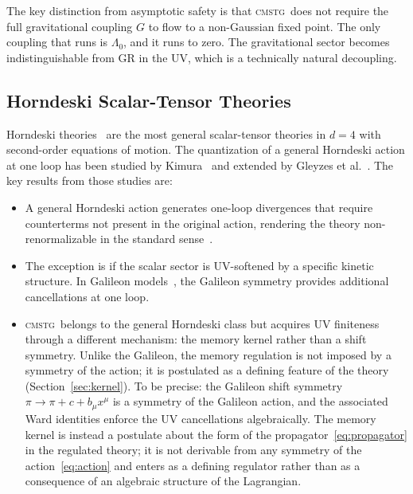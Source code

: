 \documentclass[12pt,a4paper]{article}
\newcommand{\CMSTG}{\textsc{cmstg}}
\newcommand{\Lz}{{\Lambda_0}}
\begin{document}
The key distinction from asymptotic safety is that \CMSTG\ does not
require the full gravitational coupling $G$ to flow to a non-Gaussian fixed
point. The only coupling that runs is $\Lz$, and it runs to zero. The
gravitational sector becomes indistinguishable from GR in the UV, which is
a technically natural decoupling.

\subsection{Horndeski Scalar-Tensor Theories}

Horndeski theories~\cite{Horndeski1974} are the most general scalar-tensor
theories in $d=4$ with second-order equations of motion. The quantization
of a general Horndeski action at one loop has been studied by
Kimura~\cite{Kimura2011} and extended by
Gleyzes et al.~\cite{Gleyzes2015}. The key results from those studies are:

\begin{itemize}
  \item A general Horndeski action generates one-loop divergences that require
    counterterms not present in the original action, rendering the theory
    non-renormalizable in the standard sense~\cite{deRham2011}.

  \item The exception is if the scalar sector is UV-softened by a specific
    kinetic structure. In Galileon models~\cite{Nicolis2009,deRham2011},
    the Galileon symmetry provides additional cancellations at one loop.

  \item \CMSTG\ belongs to the general Horndeski class but acquires
    UV finiteness through a different mechanism: the memory kernel rather
    than a shift symmetry. Unlike the Galileon, the memory regulation is
    not imposed by a symmetry of the action; it is postulated as a defining
    feature of the theory (Section~\ref{sec:kernel}).
    To be precise: the Galileon shift symmetry $\pi \to \pi + c + b_\mu x^\mu$
    is a symmetry of the Galileon action, and the associated Ward identities
    enforce the UV cancellations algebraically. The memory kernel is instead
    a postulate about the form of the propagator~\eqref{eq:propagator} in the
    regulated theory; it is not derivable from any symmetry of the
    action~\eqref{eq:action} and enters as a defining regulator rather than
    as a consequence of an algebraic structure of the Lagrangian.
\end{itemize}
\end{document}
